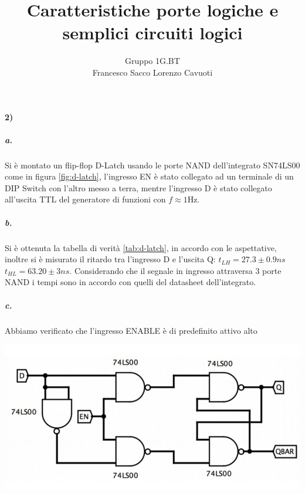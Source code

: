 \documentclass{article}
\date{}
\author{Gruppo 1G.BT \\ Francesco Sacco Lorenzo Cavuoti}
\title{Caratteristiche porte logiche e semplici circuiti logici}
\begin{document}
\maketitle
\paragraph{2)}
	\subparagraph{a.} Si è montato un flip-flop D-Latch usando le porte NAND dell'integrato SN74LS00 come in figura \ref{fig:d-latch}, l'ingresso EN è stato collegato ad un terminale di un DIP Switch con l'altro messo a terra, mentre l'ingresso D è stato collegato all'uscita TTL del generatore di funzioni con $f\approx1$Hz.
	\subparagraph{b.} Si è ottenuta la tabella di verità \ref{tab:d-latch}, in accordo con le aspettative, inoltre si è misurato il ritardo tra l'ingresso D e l'uscita Q: $t_{LH}=27.3\pm0.9 ns$ $t_{HL}=63.20\pm3 ns$. Considerando che il segnale in ingresso attraversa 3 porte NAND i tempi sono in accordo con quelli del datasheet dell'integrato.
	\subparagraph{c.} Abbiamo verificato che l'ingresso ENABLE è di predefinito attivo alto\newline
	
	\begin{minipage}{.6\linewidth}
		\centering
		\includegraphics[width=\linewidth]{immagini/dlach}
		\label{fig:d-latch}
	\end{minipage}
	\begin{minipage}{.4\linewidth}
		
		\label{tab:d-latch}
	\end{minipage}\newline
\end{document}
